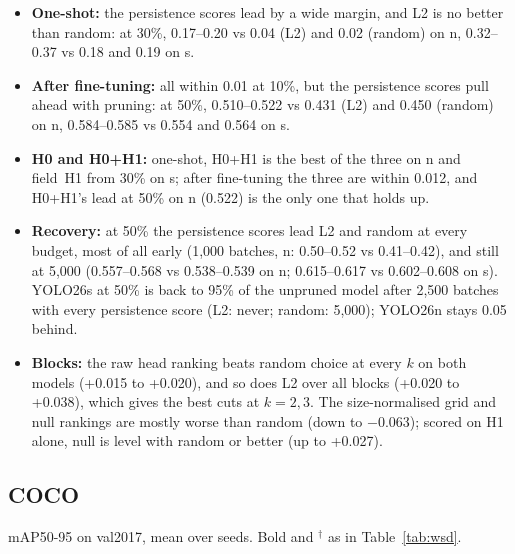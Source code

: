 \documentclass[10pt]{article}
\newcommand{\tnote}[1]{\par\vspace{3pt}\begin{minipage}{\linewidth}\footnotesize #1\end{minipage}}  %
\newcommand{\tbl}[1]{\adjustbox{max width=\linewidth}{}}
\begin{document}
\begin{itemize}
\item \textbf{One-shot:} the persistence scores lead by a wide margin, and L2 is no better than
  random: at 30\%, 0.17--0.20 vs 0.04 (L2) and 0.02 (random) on n, 0.32--0.37 vs 0.18 and 0.19 on s.
\item \textbf{After fine-tuning:} all within 0.01 at 10\%, but the persistence scores pull ahead
  with pruning: at 50\%, 0.510--0.522 vs 0.431 (L2) and 0.450 (random) on n, 0.584--0.585 vs 0.554 and
  0.564 on s.
\item \textbf{H0 and H0+H1:} one-shot, H0+H1 is the best of the three on n and field~H1 from 30\% on s;
  after fine-tuning the three are within 0.012, and H0+H1's lead at 50\% on n (0.522) is the only one
  that holds up.
\item \textbf{Recovery:} at 50\% the persistence scores lead L2 and random at every budget, most of all
  early (1,000 batches, n: 0.50--0.52 vs 0.41--0.42), and still at 5,000 (0.557--0.568 vs 0.538--0.539
  on n; 0.615--0.617 vs 0.602--0.608 on s). YOLO26s at 50\% is back to 95\% of the unpruned model after
  2,500 batches with every persistence score (L2: never; random: 5,000); YOLO26n stays 0.05 behind.
\item \textbf{Blocks:} the raw head ranking beats random choice at every $k$ on both models (+0.015 to
  +0.020), and so does L2 over all blocks (+0.020 to +0.038), which gives the best cuts at $k = 2, 3$.
  The size-normalised grid and null rankings are mostly worse than random (down to $-$0.063); scored
  on H1 alone, null is level with random or better (up to +0.027).
\end{itemize}

\subsection{COCO}

\begin{table}[H]
\centering\small
\caption{COCO: channel pruning by criterion}
\tbl{coco_channel}
\tnote{mAP50-95 on val2017, mean over seeds. Bold and $^\dagger$ as in Table~\ref{tab:wsd}.}
\end{table}
\end{document}
